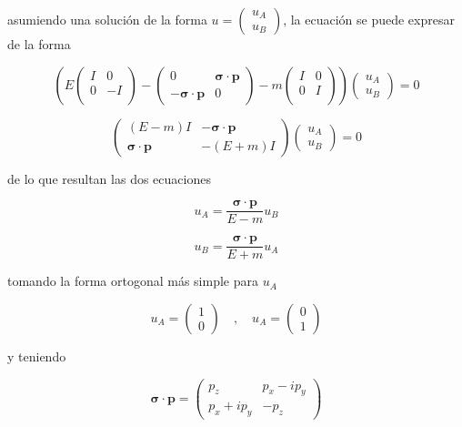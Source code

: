 asumiendo una solución de la forma $u=\begin{pmatrix} u_A \\ u_B \end{pmatrix}$, la ecuación se puede expresar de la forma

$$ \left(E\begin{pmatrix}
I & 0 \\
0 & -I \\
\end{pmatrix} - \begin{pmatrix}
0 & \boldsymbol\sigma \cdot \textbf{p} \\
-\boldsymbol\sigma \cdot \textbf{p} & 0 
\end{pmatrix} - m\begin{pmatrix}
I & 0 \\
0 & I \\
\end{pmatrix}\right)\begin{pmatrix}
u_A \\
u_B
\end{pmatrix} = 0 $$

$$ \begin{pmatrix}
(E-m)I & -\boldsymbol\sigma \cdot \textbf{p} \\
\boldsymbol\sigma \cdot \textbf{p} & -(E+m)I
\end{pmatrix}\begin{pmatrix}
u_A \\
u_B
\end{pmatrix}= 0 $$

de lo que resultan las dos ecuaciones

$$ u_A = \frac{\boldsymbol\sigma \cdot \textbf{p}}{E-m}u_B $$

$$ u_B = \frac{\boldsymbol\sigma \cdot \textbf{p}}{E+m}u_A $$

tomando la forma ortogonal más simple para $u_A$

$$ u_A = \begin{pmatrix}
1 \\
0
\end{pmatrix} \quad , \quad u_A = \begin{pmatrix}
0 \\
1
\end{pmatrix} $$

y teniendo

$$ \boldsymbol\sigma \cdot \textbf{p} = \begin{pmatrix}
p_z & p_x -ip_y \\
p_x+ip_y & -p_z 
\end{pmatrix} $$

